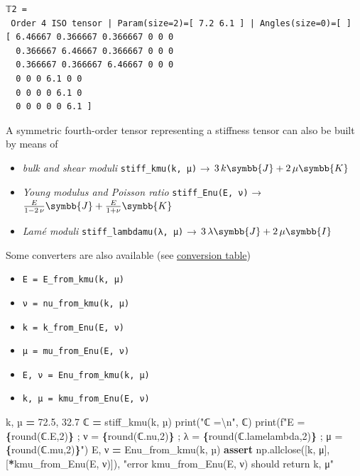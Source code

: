 \documentclass[
  a4paper,
  numbers=noendperiod,
  DIV=12]{scrreprt}
\newenvironment{Shaded}{\begin{snugshade}}{\end{snugshade}}
\newcommand{\BuiltInTok}[1]{#1}
\newcommand{\CharTok}[1]{\textcolor[rgb]{0.31,0.60,0.02}{#1}}
\newcommand{\ControlFlowTok}[1]{\textcolor[rgb]{0.13,0.29,0.53}{\textbf{#1}}}
\newcommand{\DecValTok}[1]{\textcolor[rgb]{0.00,0.00,0.81}{#1}}
\newcommand{\FloatTok}[1]{\textcolor[rgb]{0.00,0.00,0.81}{#1}}
\newcommand{\NormalTok}[1]{#1}
\newcommand{\OperatorTok}[1]{\textcolor[rgb]{0.81,0.36,0.00}{\textbf{#1}}}
\newcommand{\SpecialCharTok}[1]{\textcolor[rgb]{0.81,0.36,0.00}{\textbf{#1}}}
\newcommand{\SpecialStringTok}[1]{\textcolor[rgb]{0.31,0.60,0.02}{#1}}
\newcommand{\StringTok}[1]{\textcolor[rgb]{0.31,0.60,0.02}{#1}}
\providecommand{\tightlist}{%
  \setlength{\itemsep}{0pt}\setlength{\parskip}{0pt}}\usepackage{longtable,booktabs,array}
\newcommand{\uuuu}[1]{{\symbb{{#1}}}}
\begin{document}
\begin{verbatim}
𝕋2 =
 Order 4 ISO tensor | Param(size=2)=[ 7.2 6.1 ] | Angles(size=0)=[ ]
[ 6.46667 0.366667 0.366667 0 0 0 
  0.366667 6.46667 0.366667 0 0 0 
  0.366667 0.366667 6.46667 0 0 0 
  0 0 0 6.1 0 0 
  0 0 0 0 6.1 0 
  0 0 0 0 0 6.1 ]
\end{verbatim}

A symmetric fourth-order tensor representing a stiffness tensor can also
be built by means of

\begin{itemize}
\tightlist
\item
  \emph{bulk and shear moduli} \texttt{stiff\_kmu(k,\ µ)} →
  \(3\,k \uuuu{J} + 2\,\mu \uuuu{K}\)
\item
  \emph{Young modulus and Poisson ratio} \texttt{stiff\_Enu(E,\ ν)} →
  \(\frac{E}{1-2\,\nu} \uuuu{J} + \frac{E}{1+\nu} \uuuu{K}\)
\item
  \emph{Lamé moduli} \texttt{stiff\_lambdamu(λ,\ μ)} →
  \(3\,\lambda \uuuu{J} + 2\,\mu \uuuu{I}\)
\end{itemize}

Some converters are also available (see
\href{https://en.wikipedia.org/wiki/Lam\%C3\%A9_parameters}{conversion
table})

\begin{itemize}
\tightlist
\item
  \texttt{E\ =\ E\_from\_kmu(k,\ µ)}
\item
  \texttt{ν\ =\ nu\_from\_kmu(k,\ µ)}
\item
  \texttt{k\ =\ k\_from\_Enu(E,\ ν)}
\item
  \texttt{µ\ =\ mu\_from\_Enu(E,\ ν)}
\item
  \texttt{E,\ ν\ =\ Enu\_from\_kmu(k,\ µ)}
\item
  \texttt{k,\ µ\ =\ kmu\_from\_Enu(E,\ ν)}
\end{itemize}

\begin{Shaded}
\begin{Highlighting}[]
\NormalTok{k, µ }\OperatorTok{=} \FloatTok{72.5}\NormalTok{, }\FloatTok{32.7}
\NormalTok{ℂ }\OperatorTok{=}\NormalTok{ stiff\_kmu(k, µ)}
\BuiltInTok{print}\NormalTok{(}\StringTok{"ℂ =}\CharTok{\textbackslash{}n}\StringTok{"}\NormalTok{, ℂ)}
\BuiltInTok{print}\NormalTok{(}\SpecialStringTok{f"E = }\SpecialCharTok{\{}\BuiltInTok{round}\NormalTok{(ℂ.E,}\DecValTok{2}\NormalTok{)}\SpecialCharTok{\}}\SpecialStringTok{ ; ν = }\SpecialCharTok{\{}\BuiltInTok{round}\NormalTok{(ℂ.nu,}\DecValTok{2}\NormalTok{)}\SpecialCharTok{\}}\SpecialStringTok{ ; λ = }\SpecialCharTok{\{}\BuiltInTok{round}\NormalTok{(ℂ.lamelambda,}\DecValTok{2}\NormalTok{)}\SpecialCharTok{\}}\SpecialStringTok{ ; μ = }\SpecialCharTok{\{}\BuiltInTok{round}\NormalTok{(ℂ.mu,}\DecValTok{2}\NormalTok{)}\SpecialCharTok{\}}\SpecialStringTok{"}\NormalTok{)}
\NormalTok{E, ν }\OperatorTok{=}\NormalTok{ Enu\_from\_kmu(k, µ)}
\ControlFlowTok{assert}\NormalTok{ np.allclose([k, μ], [}\OperatorTok{*}\NormalTok{kmu\_from\_Enu(E, ν)]), }\StringTok{"error kmu\_from\_Enu(E, ν) should return k, μ"}
\end{Highlighting}
\end{Shaded}
\end{document}
